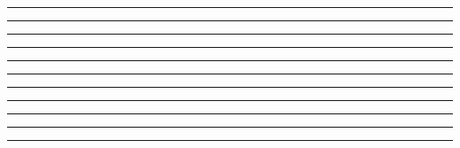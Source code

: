 \documentclass[11pt]{article}
\begin{document}
\par\nointerlineskip\noindent\hspace*{4.56mm}\rule{137.36mm}{0.4pt}\par\nointerlineskip
\par\nointerlineskip\noindent\hspace*{4.56mm}\rule{.4pt}{3.74mm}\hspace{1.2pt}\rule{.4pt}{3.74mm}\hspace{0.0mm}\hspace{20.47mm}\hspace{0.0mm}\rule{.4pt}{3.74mm}\hspace{0.0mm}\hspace{20.64mm}\hspace{0.0mm}\rule{.4pt}{3.74mm}\hspace{0.0mm}\hspace{20.56mm}\hspace{0.0mm}\rule{.4pt}{3.74mm}\hspace{0.0mm}\hspace{18.42mm}\hspace{0.0mm}\rule{.4pt}{3.74mm}\hspace{0.0mm}\hspace{18.3mm}\hspace{0.0mm}\rule{.4pt}{3.74mm}\hspace{0.0mm}\hspace{18.59mm}\hspace{0.0mm}\rule{.4pt}{3.74mm}\hspace{0.0mm}\hspace{18.13mm}\hspace{0.0mm}\rule{.4pt}{3.74mm}\hspace{1.2pt}\rule{.4pt}{3.74mm}\par\nointerlineskip
\par\fontsize{9}{12}\selectfont
\end{document}
